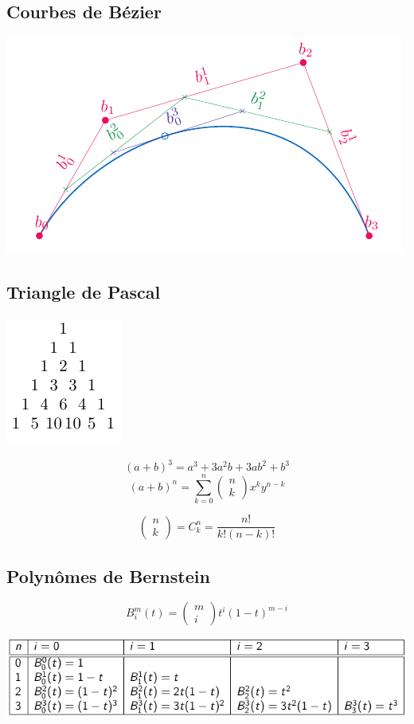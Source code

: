 \documentclass[]{article}
\begin{document}
\begin{multicols}{3}
\section{Courbes de Bézier}
\begin{center}
\includegraphics[width=0.6\columnwidth,page=1]{drwg_0.pdf}
\end{center}
\subsection{Triangle de Pascal}
\begin{center}
\includegraphics[scale=1,page=1]{drwg_1.pdf}
\end{center}
$$(a+b)^3=a^3+3a^2b+3ab^2+b^3$$
$$(a+b)^n=\sum_{k=0}^{n}\begin{pmatrix}
n\\k
\end{pmatrix}x^ky^{n-k}$$

$$\begin{pmatrix}
n\\ k
\end{pmatrix}=C^{n}_{k}=\frac{n!}{k!(n-k)!}$$
\subsection{Polynômes de Bernstein}
$$B_{i}^{m}(t)=\begin{pmatrix}m\\i\end{pmatrix}t^{i}(1-t)^{m-i}$$
\begin{center}
\includegraphics[width=\columnwidth]{img_21.pdf}
\end{center}

\end{multicols}
\end{document}
